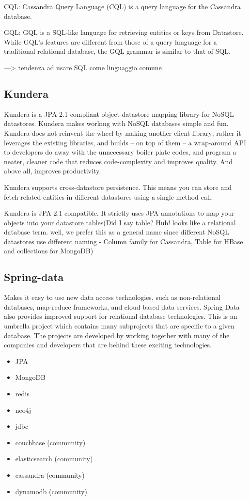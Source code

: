 CQL: Cassandra Query Language (CQL) is a query language for the Cassandra database.

GQL: GQL is a SQL-like language for retrieving entities or keys from Datastore. While GQL's features are different from those of a query language for a traditional relational database, the GQL grammar is similar to that of SQL.

---> tendenza ad usare SQL come linguaggio comune

\subsection{Kundera}
Kundera is a JPA 2.1 compliant object-datastore mapping library for NoSQL datastores. Kundera makes working with NoSQL databases simple and fun. Kundera does not reinvent the wheel by making another client library; rather it leverages the existing libraries, and builds – on top of them – a wrap-around API to developers do away with the unnecessary boiler plate codes, and program a neater, cleaner code that reduces code-complexity and improves quality. And above all, improves productivity.

Kundera supports cross-datastore persistence. This means you can store and fetch related entities in different datastores using a single method call.

Kundera is JPA 2.1 compatible. It strictly uses JPA annotations to map your objects into your datastore tables(Did I say table? Huh! looks like a relational database term. well, we prefer this as a general name since different NoSQL datastores use different naming - Column family for Cassandra, Table for HBase and collections for MongoDB)

\subsection{Spring-data}
Makes it easy to use new data access technologies, such as non-relational databases, map-reduce frameworks, and cloud based data services. Spring Data also provides improved support for relational database technologies. This is an umbrella project which contains many subprojects that are specific to a given database. The projects are developed by working together with many of the companies and developers that are behind these exciting technologies.

\begin{itemize}
\item JPA
\item MongoDB
\item redis
\item neo4j
\item jdbc
\item couchbase (community)
\item elasticsearch (community)
\item cassandra (community)
\item dynamodb (community)
\end{itemize}

